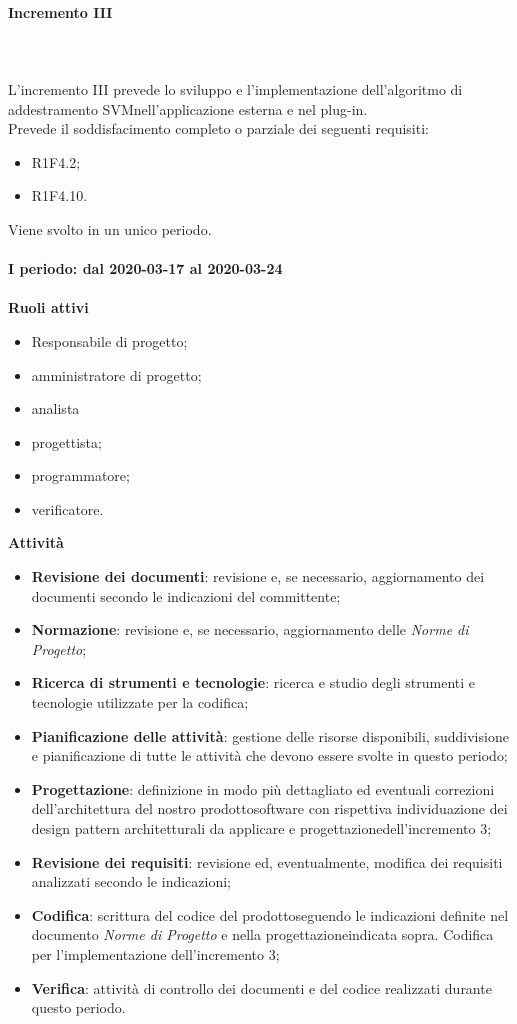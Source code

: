 \paragraph{Incremento III} \mbox{} \\ \\ 
L'incremento III prevede lo sviluppo e l'implementazione dell'algoritmo di addestramento SVM\glosp nell'applicazione esterna e nel plug-in. 
\\Prevede il soddisfacimento completo o parziale dei seguenti requisiti:
\begin{itemize}
	\item R1F4.2;
	\item R1F4.10.
\end{itemize}
Viene svolto in un unico periodo.
\mbox{} \\ \\ \textbf{I periodo: dal 2020-03-17 al 2020-03-24} \mbox{} \\ \\
\textbf{Ruoli attivi}
\begin{itemize}
	\item Responsabile di progetto\glo;
	\item amministratore di progetto\glo;
	\item analista
	\item progettista;
	\item programmatore;
	\item verificatore.
\end{itemize}
\textbf{Attività} 
\begin{itemize}
	\item \textbf{Revisione dei documenti}: revisione e, se necessario, aggiornamento dei documenti secondo le indicazioni del committente;
	\item \textbf{Normazione}: revisione e, se necessario, aggiornamento delle \textit{Norme di Progetto};
	\item \textbf{Ricerca di strumenti e tecnologie}: ricerca e studio degli strumenti e tecnologie utilizzate per la codifica;
	\item \textbf{Pianificazione delle attività}: gestione delle risorse disponibili, suddivisione e pianificazione di tutte le attività che devono essere svolte in questo periodo;
	\item \textbf{Progettazione}\glo: definizione in modo più dettagliato ed eventuali correzioni dell'architettura del nostro prodotto\glosp software con rispettiva individuazione dei design pattern architetturali da applicare e progettazione\glosp dell'incremento 3; 
	\item \textbf{Revisione dei requisiti}: revisione ed, eventualmente, modifica dei requisiti analizzati secondo le indicazioni; 
	\item \textbf{Codifica}: scrittura del codice del prodotto\glosp seguendo le indicazioni definite nel documento \textit{Norme di Progetto} e nella progettazione\glosp indicata sopra. Codifica per l'implementazione dell'incremento 3; 
	\item \textbf{Verifica}: attività di controllo dei documenti e del codice realizzati durante questo periodo.
\end{itemize}
